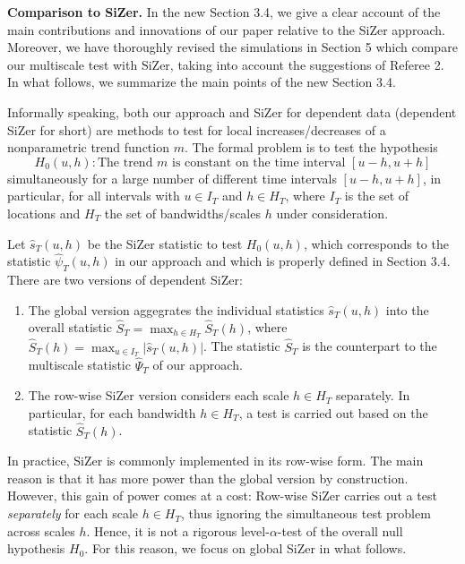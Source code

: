 \documentclass[a4paper,12pt]{article}
\begin{document}
\textbf{Comparison to SiZer.} In the new Section 3.4, we give a clear account of the main contributions and innovations of our paper relative to the SiZer approach.
Moreover, we have thoroughly revised the simulations in Section 5 which compare our multiscale test with SiZer, taking into account the suggestions of Referee 2. 
In what follows, we summarize the main points of the new Section 3.4. 


Informally speaking, both our approach and SiZer for dependent data (dependent SiZer for short) are methods to test for local increases/decreases of a nonparametric trend function $m$. The formal problem is to test the hypothesis
\[ H_0(u,h): \text{The trend } m \text{ is constant on the time interval } [u-h,u+h] \]
simultaneously for a large number of different time intervals $[u-h,u+h]$, in particular, for all intervals with $u \in I_T$ and $h \in H_T$, where $I_T$ is the set of locations and $H_T$ the set of bandwidths/scales $h$ under consideration. 


Let $\widehat{s}_T(u,h)$ be the SiZer statistic to test $H_0(u,h)$, which corresponds to the statistic $\widehat{\psi}_T(u,h)$ in our approach and which is properly defined in Section 3.4. There are two versions of dependent SiZer: 
\begin{enumerate}[label=(\alph*), leftmargin=0.8cm]

\item The global version aggegrates the individual statistics $\widehat{s}_T(u,h)$ into the overall statistic $\widehat{S}_T = \max_{h \in H_T} \widehat{S}_T(h)$, where $\widehat{S}_T(h) = \max_{u \in I_T} |\widehat{s}_T(u,h)|$. The statistic $\widehat{S}_T$ is the counterpart to the multiscale statistic $\widehat{\Psi}_T$ of our approach. 

\item The row-wise SiZer version considers each scale $h \in H_T$ separately. In particular, for each bandwidth $h \in H_T$, a test is carried out based on the statistic $\widehat{S}_T(h)$. 

\end{enumerate}
In practice, SiZer is commonly implemented in its row-wise form. The main reason is that it has more power than the global version by construction. However, this gain of power comes at a cost: Row-wise SiZer carries out a test \textit{separately} for each scale $h \in H_T$, thus ignoring the simultaneous test problem across scales $h$. Hence, it is not a rigorous level-$\alpha$-test of the overall null hypothesis $H_0$. For this reason, we focus on global SiZer in what follows. 
\end{document}

